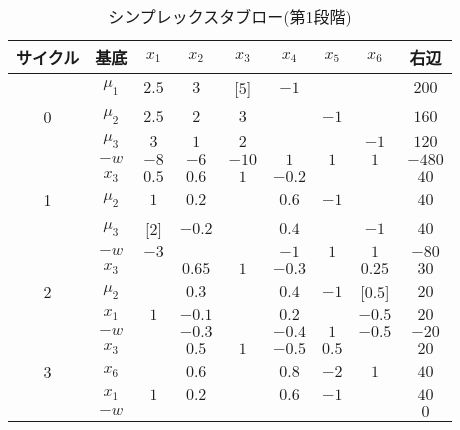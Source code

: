 \documentclass{jsreport}
\begin{document}
\begin{table}[htb]
  \centering
    \caption{シンプレックスタブロー(第1段階)}
    \begin{tabular}{c|c|cccccc|c}
    サイクル & 基底     & $x_1$ & $x_2$ & $x_3$ & $x_4$ & $x_5$ & $x_6$ & 右辺  \\ \hline
            & $\mu_1$ & $2.5$ & $3$   & [$5$] & $-1$  &       &       & $200$ \\
       0    & $\mu_2$ & $2.5$ & $2$   & $3$   &       & $-1$  &       & $160$ \\
            & $\mu_3$ & $3$   & $1$   & $2$   &       &       & $-1$  & $120$ \\ \cline{2-9}
            & $-w$    & $-8$  & $-6$  & $-10$ & $1$   & $1$   & $1$   & $-480$\\ \hline

            & $x_3$   & $0.5$ & $0.6$ & $1$   & $-0.2$&       &       & $40$ \\
       1    & $\mu_2$ & $1$   & $0.2$ &       & $0.6$ & $-1$  &       & $40$ \\
            & $\mu_3$ & [$2$] & $-0.2$&       &  $0.4$&       & $-1$  & $40$ \\ \cline{2-9}
            & $-w$    & $-3$  &       &       & $-1$  & $1$   & $1$   & $-80$\\ \hline

            & $x_3$   &       & $0.65$& $1$   & $-0.3$&       & $0.25$& $30$ \\
       2    & $\mu_2$ &       & $0.3$ &       & $0.4$ & $-1$  &[$0.5$]& $20$ \\
            & $x_1$   & $1$   & $-0.1$&       &  $0.2$&       & $-0.5$& $20$ \\ \cline{2-9}
            & $-w$    &       & $-0.3$&       & $-0.4$& $1$   & $-0.5$& $-20$\\ \hline

            & $x_3$   &       & $0.5$ & $1$   & $-0.5$& $0.5$ &       & $20$ \\
       3    & $x_6$   &       & $0.6$ &       & $0.8$ & $-2$  &$1$    & $40$ \\
            & $x_1$   & $1$   & $0.2$ &       &  $0.6$&  $-1$ &       & $40$ \\ \cline{2-9}
            & $-w$    &       &       &       &       &       &       & $0$  \\ \hline
    \end{tabular}
    \label{tab:twophase_phase1}
\end{table}
\end{document}
